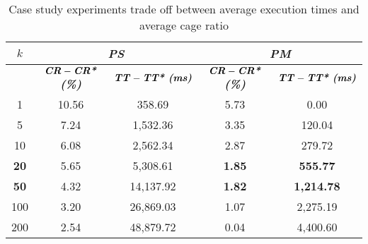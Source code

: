 \begin{table}[htbp]
    \caption{Case study experiments trade off between average execution times and average cage ratio}
    \centering
    \begin{tabular}{|c|c|c|c|c|}
    \hline
    \multicolumn{1}{|c|}{\textbf{$k$}} & \multicolumn{ 2}{c|}{\textbf{\textit{PS}}} & \multicolumn{ 2}{c|}{\textbf{\textit{PM}}} \\ \hline
    \multicolumn{1}{|c|}{} & $\textbf{\textit{CR}} - \textbf{\textit{CR*}}$ \textbf{\textit{(\%)}} & $\textbf{\textit{TT}} - \textbf{\textit{TT* (ms)}}$ & $\textbf{\textit{CR}} - \textbf{\textit{CR*}}$ \textbf{\textit{(\%)}} & $\textbf{\textit{TT}} - \textbf{\textit{TT* (ms)}}$ \\ \hline
    1 & 10.56 & 358.69 & 5.73 & 0.00 \\
    5 & 7.24 & 1,532.36 & 3.35 & 120.04 \\
    10 & 6.08 & 2,562.34 & 2.87 & 279.72 \\
    \textbf{20} & 5.65 & 5,308.61 & \textbf{1.85} & \textbf{555.77} \\
    \textbf{50} & 4.32 & 14,137.92 & \textbf{1.82} & \textbf{1,214.78} \\
    100 & 3.20 & 26,869.03 & 1.07 & 2,275.19 \\
    200 & 2.54 & 48,879.72 & 0.04 & 4,400.60 \\ \hline
    \end{tabular}
    \label{exp:usecase_tradeoff}
\end{table}
    